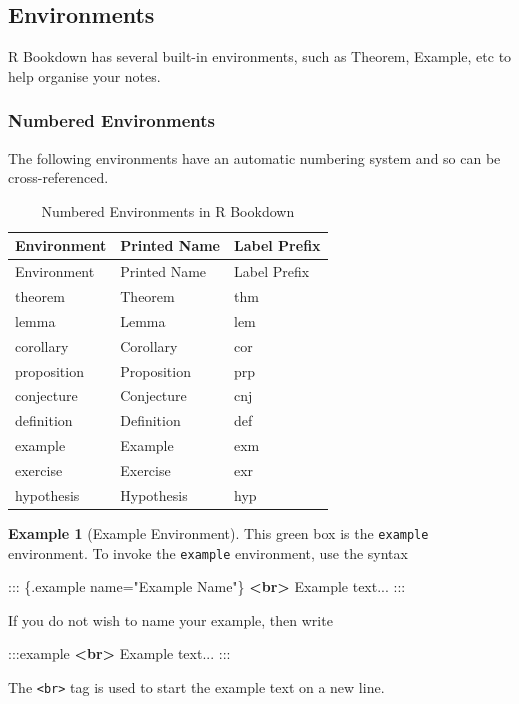 \documentclass[
]{article}
\newenvironment{Shaded}{\begin{snugshade}}{\end{snugshade}}
\newcommand{\KeywordTok}[1]{\textcolor[rgb]{0.13,0.29,0.53}{\textbf{#1}}}
\newcommand{\NormalTok}[1]{#1}
\numberwithin{equation}{section}
\numberwithin{figure}{section}
\theoremstyle{break}
\theoremstyle{definition}
\theoremstyle{definition}
\newtheorem{example}{Example}[section]
\theoremstyle{definition}
\theoremstyle{definition}
\theoremstyle{remark}
\begin{document}
\hypertarget{environments}{%
\subsection{Environments}\label{environments}}

R Bookdown has several built-in environments, such as Theorem, Example, etc to help organise your notes.

\hypertarget{numbered-environments}{%
\subsubsection{Numbered Environments}\label{numbered-environments}}

The following environments have an automatic numbering system and so can be cross-referenced.

\begin{longtable}[]{@{}lll@{}}
\caption{\label{tab:num-envs} Numbered Environments in R Bookdown}\tabularnewline
\toprule\noalign{}
Environment & Printed Name & Label Prefix \\
\midrule\noalign{}
\endfirsthead
\toprule\noalign{}
Environment & Printed Name & Label Prefix \\
\midrule\noalign{}
\endhead
\bottomrule\noalign{}
\endlastfoot
theorem & Theorem & thm \\
lemma & Lemma & lem \\
corollary & Corollary & cor \\
proposition & Proposition & prp \\
conjecture & Conjecture & cnj \\
definition & Definition & def \\
example & Example & exm \\
exercise & Exercise & exr \\
hypothesis & Hypothesis & hyp \\
\end{longtable}

\begin{example}[Example Environment]
This green box is the \texttt{example} environment. To invoke the \texttt{example} environment, use the syntax

\begin{Shaded}
\begin{Highlighting}[]
\NormalTok{::: \{.example name="Example Name"\}}
\KeywordTok{\textless{}br\textgreater{}}
\NormalTok{Example text...}
\NormalTok{:::}
\end{Highlighting}
\end{Shaded}

If you do not wish to name your example, then write

\begin{Shaded}
\begin{Highlighting}[]
\NormalTok{:::example}
\KeywordTok{\textless{}br\textgreater{}}
\NormalTok{Example text...}
\NormalTok{:::}
\end{Highlighting}
\end{Shaded}

The \texttt{\textless{}br\textgreater{}} tag is used to start the example text on a new line.
\end{example}
\end{document}
